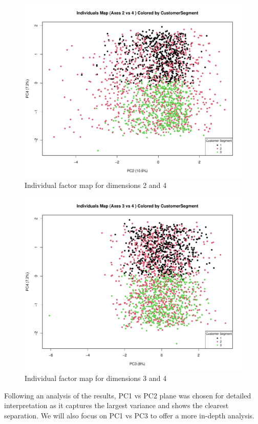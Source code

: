 \begin{figure}[H]
    \centering
    \includegraphics[width=0.8\linewidth]{Imatges/individuals_map_2_4.pdf}
    \caption{Individual factor map for dimensions 2 and 4}
    \label{fig:individuals_map_2_4}
\end{figure}

\begin{figure}[H]
    \centering
    \includegraphics[width=0.8\linewidth]{Imatges/individuals_map_3_4.pdf}
    \caption{Individual factor map for dimensions 3 and 4}
    \label{fig:individuals_map_3_4}
\end{figure}

\newpage
Following an analysis of the results, PC1 vs PC2 plane was chosen for detailed interpretation as it captures the largest variance and shows the clearest separation. We will also focus on PC1 vs PC3 to offer a more in-depth analysis.




